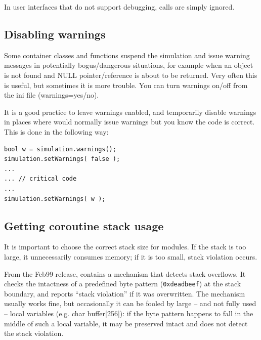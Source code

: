 In user interfaces that do not support debugging,  
calls are simply ignored.





\subsection{Disabling warnings}

Some container classes and functions suspend the simulation and issue
warning messages in potentially bogus/dangerous situations, for
example when an object is not found and NULL pointer/reference is
about to be returned. Very often this is useful, but sometimes it is
more trouble. You can turn warnings on/off from the ini file
(warnings=yes/no).


It is a good practice to leave warnings enabled, and
temporarily disable warnings in places where {\opp} would normally
issue warnings but you know the code is correct. This is done in the
following way:

\begin{Verbatim}
bool w = simulation.warnings();
simulation.setWarnings( false );
...
... // critical code
...
simulation.setWarnings( w );
\end{Verbatim}





\subsection{Getting coroutine stack usage}

It is important to choose the correct stack size for
modules.  If the stack is
too large, it unnecessarily consumes memory; if it is too small, stack
violation occurs.

From the Feb99 release, {\opp} contains a mechanism that detects stack
overflows. It checks the intactness of a
predefined byte pattern (\texttt{0xdeadbeef}) at the stack boundary,
and reports ``stack violation'' if it was
overwritten. The mechanism usually works fine, but occasionally it can
be fooled by large -- and not fully used -- local variables (e.g. char
buffer[256]): if the byte pattern happens to fall in the middle of
such a local variable, it may be preserved intact and {\opp} does not
detect the stack violation.

